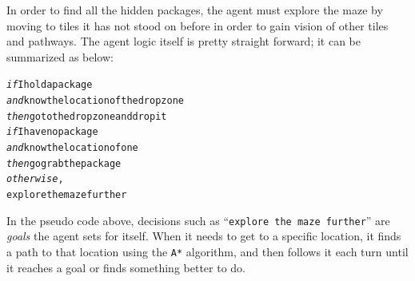 In order to find all the hidden packages, the agent must explore the
maze by moving to tiles it has not stood on before in order to gain
vision of other tiles and pathways. The agent logic itself is pretty
straight forward; it can be summarized as below:

\begin{alltt}
\textit{if} I hold a package 
        \textit{and} know the location of the dropzone
    \textit{then} go to the dropzone and drop it
\textit{if} I have no package 
        \textit{and} know the location of one 
    \textit{then} go grab the package
\textit{otherwise}, 
    explore the maze further
\end{alltt}

In the pseudo code above, decisions such as ``\texttt{explore the
maze further}'' are \emph{goals} the agent sets for itself. When
it needs to get to a specific location, it finds a path to that location
using the \texttt{A{*}} algorithm, and then follows it each turn until
it reaches a goal or finds something better to do.
